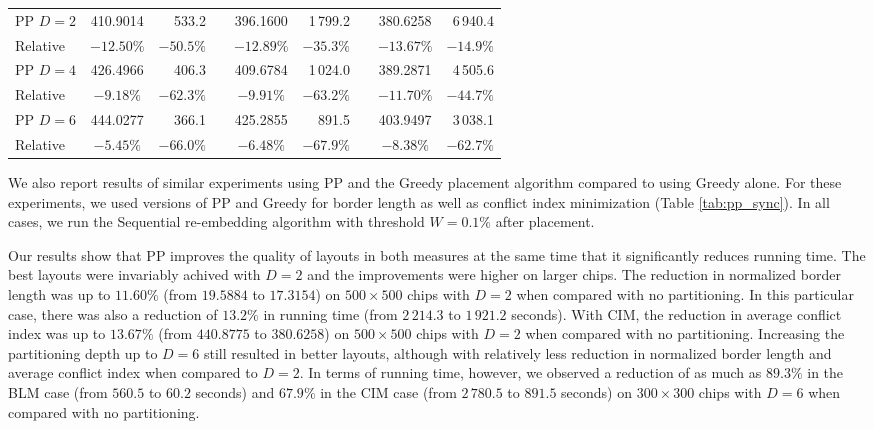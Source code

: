 \begin{table}[t!]
{\begin{tabular}{lcrlcrlcr}
\hline
PP $D=2$ & 410.9014 &    533.2   & & 396.1600 & 1\,799.2   & & 380.6258 & 6\,940.4   \\
Relative &$-12.50\%$&   $-50.5\%$& &$-12.89\%$&   $-35.3\%$& &$-13.67\%$&   $-14.9\%$\\
\hline
PP $D=4$ & 426.4966 &    406.3   & & 409.6784 & 1\,024.0   & & 389.2871 & 4\,505.6   \\
Relative & $-9.18\%$&   $-62.3\%$& & $-9.91\%$&   $-63.2\%$& &$-11.70\%$&   $-44.7\%$\\
\hline
PP $D=6$ & 444.0277 &    366.1   & & 425.2855 &    891.5   & & 403.9497 & 3\,038.1   \\
Relative & $-5.45\%$&   $-66.0\%$& & $-6.48\%$&   $-67.9\%$& & $-8.38\%$&   $-62.7\%$\\
\hline
\end{tabular}}
\end{table}

We also report results of similar experiments using PP and the Greedy placement
algorithm compared to using Greedy alone. For these experiments, we used
versions of PP and Greedy for border length as well as conflict index
minimization (Table \ref{tab:pp_sync}). In all cases, we run the Sequential
re-embedding algorithm with threshold $W=0.1\%$ after placement.

Our results show that PP improves the quality of layouts in both measures at the
same time that it significantly reduces running time. The best layouts were
invariably achived with $D=2$ and the improvements were higher on larger chips.
The reduction in normalized border length was up to $11.60\%$ (from $19.5884$ to
$17.3154$) on $500\times 500$ chips with $D=2$ when compared with no
partitioning. In this particular case, there was also a reduction of $13.2\%$ in
running time (from $2\,214.3$ to $1\,921.2$ seconds). With CIM, the reduction in
average conflict index was up to $13.67\%$ (from $440.8775$ to $380.6258$) on
$500\times 500$ chips with $D=2$ when compared with no partitioning. Increasing
the partitioning depth up to $D=6$ still resulted in better layouts, although
with relatively less reduction in normalized border length and average conflict
index when compared to $D=2$. In terms of running time, however, we observed a
reduction of as much as $89.3\%$ in the BLM case (from $560.5$ to $60.2$
seconds) and $67.9\%$ in the CIM case (from $2\,780.5$ to $891.5$ seconds) on
$300\times 300$ chips with $D=6$ when compared with no partitioning.

